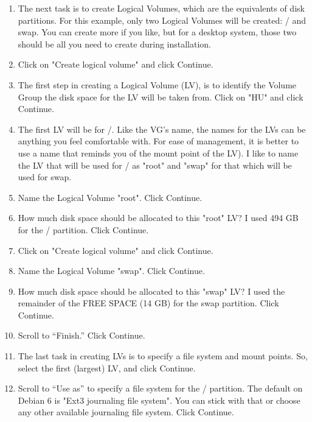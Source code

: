 \documentclass[12pt,notitlepage,onecolumn,oneside,openany]{memoir}
\begin{document}
\begin{enumerate}
\item \textsf{The next task is to create Logical Volumes, which are the equivalents of disk partitions. For this example, only two Logical Volumes will be created: / and swap. You can create more if you like, but for a desktop system, those two should be all you need to create during installation.} 

\item \textsf{Click on "Create logical volume" and click Continue.}
 
\item \textsf{The first step in creating a Logical Volume (LV), is to identify the Volume Group the disk space for the LV will be taken from. Click on "HU" and click Continue.} 

\item \textsf{The first LV will be for /. Like the VG’s name, the names for the LVs can be anything you feel comfortable with. For ease of management, it is better to use a name that reminds you of the mount point of the LV). I like to name the LV that will be used for / as "root" and "swap" for that which will be used for swap.} 

\item \textsf{Name the Logical Volume "root". Click Continue.} 

\item \textsf{How much disk space should be allocated to this "root" LV? I used 494 GB for the / partition. Click Continue.} 

\item \textsf{Click on "Create logical volume" and click Continue.}
 
\item \textsf{Name the Logical Volume "swap". Click Continue.} 

\item \textsf{How much disk space should be allocated to this "swap" LV? I used the remainder of the FREE SPACE (14 GB) for the swap partition. Click Continue.} 

\item \textsf{Scroll to “Finish.” Click Continue.} 

\item \textsf{The last task in creating LVs is to specify a file system and mount points. So, select the first (largest) LV, and click Continue.} 

\item \textsf{Scroll to “Use as” to specify a file system for the / partition. The default on Debian 6 is "Ext3 journaling file system". You can stick with that or choose any other available journaling file system. Click Continue.}
 

\end{enumerate}
\end{document}
